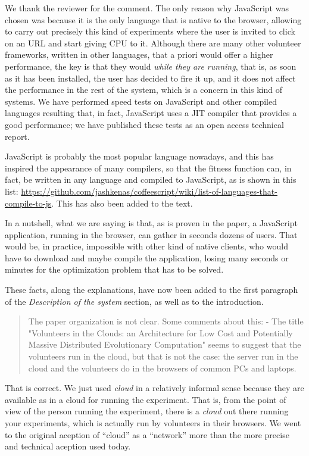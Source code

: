 \documentclass[preprint]{elsarticle}
\begin{document}
We thank the reviewer for the comment. The only reason why JavaScript
was chosen was because it is the only language that is native to the
browser, allowing to carry out precisely this kind of experiments
where the user is invited to click on an URL and start giving CPU to
it. Although there are many other volunteer frameworks, written in
other languages, that a priori would offer a higher performance, the
key is that they would {\em while they are running}, that is, as soon
as it has been installed, the user has decided to fire it up, and it
does not affect the performance in the rest of the system, which is a
concern in this kind of systems. We have performed speed tests on
JavaScript and other compiled languages resulting that, in fact,
JavaScript uses a JIT compiler that provides a good performance; we
have published these tests as an open access technical report. 

JavaScript is probably the most popular language nowadays, and this
has inspired the appearance of many compilers, so that the fitness
function can, in fact, be written in any language and compiled to
JavaScript, as is shown in this list:
\url{https://github.com/jashkenas/coffeescript/wiki/list-of-languages-that-compile-to-js}. This
has also been added to the text.

In a nutshell, what we are saying is that, as is proven in the paper,
a JavaScript application, running in the browser, can gather in
seconds dozens of users. That would be, in practice, impossible with
other kind of native clients, who would have to download and maybe
compile the application, losing many seconds or minutes for the
optimization problem that has to be solved.

These facts, along the explanations, have now been added to the first
paragraph of the {\em Description of the system} section, as well as
to the introduction.

\begin{quote}
The paper organization is not clear. Some comments about this:
- The title "Volunteers in the Clouds: an Architecture for Low Cost and Potentially Massive Distributed
Evolutionary Computation" seems to suggest that the volunteers run in the cloud, but that is not the case:
the server run in the cloud and the volunteers do in the browsers of
common PCs and laptops.
\end{quote}

That is correct. We just used {\em cloud} in a relatively informal
sense because they are available as in a cloud for running the
experiment. That is, from the point of view of the person running the
experiment, there is a {\em cloud} out there running your experiments,
which is actually run by volunteers in their browsers. We went to the
original aception of ``cloud'' as a ``network'' more than the more
precise and technical aception used today. 
\end{document}
